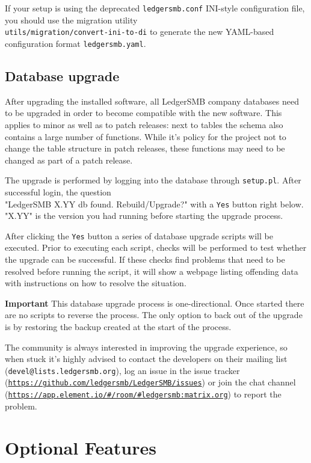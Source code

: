 If your setup is using the deprecated \texttt{ledgersmb.conf} INI-style configuration
file, you should use the migration utility\\
\texttt{utils/migration/convert-ini-to-di}
to generate the new YAML-based configuration format \texttt{ledgersmb.yaml}.

\section{Database upgrade}
\label{sec-updates-database-upgrades}

After upgrading the installed software, all LedgerSMB company databases need to be
upgraded in order to become compatible with the new software.  This applies to minor
as well as to patch releases: next to tables the schema
also contains a large number of functions.  While it's policy for the project not to
change the table structure in patch releases, these functions may need to be changed
as part of a patch release.

The upgrade is
performed by logging into the database through \texttt{setup.pl}.  After successful
login, the question \\
"LedgerSMB X.YY db found. Rebuild/Upgrade?" with a \texttt{Yes}
button right below. "X.YY" is the version you had running before starting the upgrade
process.

After clicking the \texttt{Yes} button a series of database upgrade scripts will be
executed.  Prior to executing each script, checks will be performed to test whether
the upgrade can be successful.  If these checks find problems that need to be resolved
before running the script, it will show a webpage listing offending data with instructions
on how to resolve the situation.

\textbf{Important} This database upgrade process is one-directional.  Once started
there are no scripts to reverse the process.  The only option to back out of the
upgrade is by restoring the backup created at the start of the process.

The community is always interested in improving the upgrade experience, so when stuck
it's highly advised to contact the developers on their mailing list
(\texttt{devel@lists.ledgersmb.org}), log an issue in the issue tracker
(\texttt{\url{https://github.com/ledgersmb/LedgerSMB/issues}}) or join the chat channel
(\texttt{\url{https://app.element.io/\#/room/\#ledgersmb:matrix.org}})
to report the problem.

\chapter{Optional Features}
\label{cha-options}

